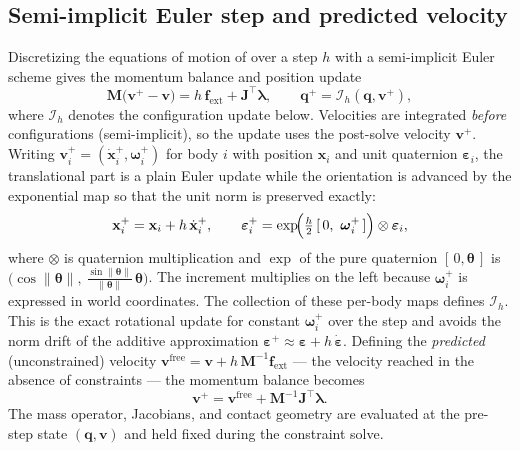 \documentclass{article}
\newcommand{\M}{\mathbf{M}}
\newcommand{\Jac}{\mathbf{J}}
\newcommand{\vv}{\mathbf{v}}
\newcommand{\vfree}{\mathbf{v}^{\mathrm{free}}}
\newcommand{\fext}{\mathbf{f}_{\mathrm{ext}}}
\newcommand{\blam}{\boldsymbol{\lambda}}
\theoremstyle{plain}
\theoremstyle{definition}
\begin{document}
\subsection{Semi-implicit Euler step and predicted velocity}
\label{sec:euler}
Discretizing the equations of motion of  over a step $h$ with a
semi-implicit Euler scheme gives the momentum balance and position update
\begin{equation}
\M\bigl(\vv^{+}-\vv\bigr) = h\,\fext + \Jac^{\top}\blam,
\qquad
\mathbf q^{+} = \mathcal I_h(\mathbf q,\vv^{+}),
\label{eq:euler}
\end{equation}
where $\mathcal I_h$ denotes the configuration update below. Velocities are
integrated \emph{before} configurations (semi-implicit), so the update uses the
post-solve velocity $\vv^{+}$. Writing $\vv_i^{+}=(\dot{\mathbf x}_i^{+},
\boldsymbol\omega_i^{+})$ for body $i$ with position $\mathbf x_i$ and unit
quaternion $\boldsymbol\varepsilon_i$, the translational part is a plain Euler
update while the orientation is advanced by the exponential map so that the unit
norm is preserved exactly:
\begin{equation}
\mathbf x_i^{+} = \mathbf x_i + h\,\dot{\mathbf x}_i^{+},
\qquad
\boldsymbol\varepsilon_i^{+} =
\exp\!\Bigl(\tfrac{h}{2}\,[\,0,\ \boldsymbol\omega_i^{+}\,]\Bigr)
\otimes\boldsymbol\varepsilon_i,
\label{eq:integrate}
\end{equation}
where $\otimes$ is quaternion multiplication and $\exp$ of the pure quaternion
$[\,0,\boldsymbol\theta\,]$ is $\bigl(\cos\|\boldsymbol\theta\|,\
\tfrac{\sin\|\boldsymbol\theta\|}{\|\boldsymbol\theta\|}\,\boldsymbol\theta\bigr)$.
The increment multiplies on the left because $\boldsymbol\omega_i^+$ is
expressed in world coordinates. The collection of these per-body maps defines
$\mathcal I_h$. This
is the exact rotational update for constant $\boldsymbol\omega_i^{+}$ over the
step and avoids the norm drift of the additive approximation
$\boldsymbol\varepsilon^{+}\approx\boldsymbol\varepsilon+h\,
\dot{\boldsymbol\varepsilon}$. Defining the \emph{predicted}
(unconstrained) velocity $\vfree=\vv+h\,\M^{-1}\fext$ --- the velocity reached in
the absence of constraints --- the momentum balance becomes
\begin{equation}
\vv^{+} = \vfree + \M^{-1}\Jac^{\top}\blam .
\label{eq:free_velocity}
\end{equation}
The mass operator, Jacobians, and contact geometry are evaluated at the
pre-step state $(\mathbf q,\vv)$ and held fixed during the constraint solve.
\end{document}
